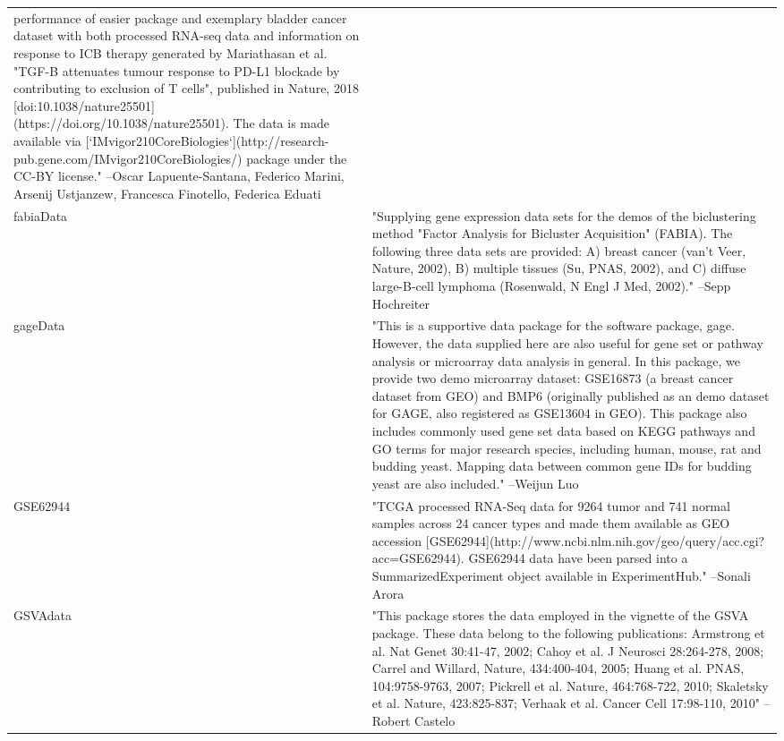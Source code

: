 \documentclass[]{article}
\begin{document}
\begin{longtable}[t]{l>{\raggedright\arraybackslash}p{25em}}
performance of easier package and exemplary bladder cancer
dataset with both processed RNA-seq data and information on
response to ICB therapy generated by Mariathasan et al. "TGF-B
attenuates tumour response to PD-L1 blockade by contributing to
exclusion of T cells", published in Nature, 2018
[doi:10.1038/nature25501](https://doi.org/10.1038/nature25501).
The data is made available via
[`IMvigor210CoreBiologies`](http://research-pub.gene.com/IMvigor210CoreBiologies/)
package under the CC-BY license." --Oscar Lapuente-Santana, Federico Marini, Arsenij Ustjanzew, Francesca Finotello, Federica Eduati\\
fabiaData & "Supplying gene expression data sets for the demos of the
biclustering method "Factor Analysis for Bicluster Acquisition"
(FABIA). The following three data sets are provided: A) breast
cancer (van't Veer, Nature, 2002), B) multiple tissues (Su,
PNAS, 2002), and C) diffuse large-B-cell lymphoma (Rosenwald, N
Engl J Med, 2002)." --Sepp Hochreiter\\
gageData & "This is a supportive data package for the software
package, gage. However, the data supplied here are also useful
for gene set or pathway analysis or microarray data analysis in
general. In this package, we provide two demo microarray
dataset: GSE16873 (a breast cancer dataset from GEO) and BMP6
(originally published as an demo dataset for GAGE, also
registered as GSE13604 in GEO). This package also includes
commonly used gene set data based on KEGG pathways and GO terms
for major research species, including human, mouse, rat and
budding yeast. Mapping data between common gene IDs for budding
yeast are also included." --Weijun Luo\\
GSE62944 & "TCGA processed RNA-Seq data for 9264 tumor and 741 normal
samples across 24 cancer types and made them available as GEO
accession
[GSE62944](http://www.ncbi.nlm.nih.gov/geo/query/acc.cgi?acc=GSE62944).
GSE62944 data have been parsed into a SummarizedExperiment
object available in ExperimentHub." --Sonali Arora\\
GSVAdata & "This package stores the data employed in the vignette of
the GSVA package. These data belong to the following
publications: Armstrong et al. Nat Genet 30:41-47, 2002; Cahoy
et al. J Neurosci 28:264-278, 2008; Carrel and Willard, Nature,
434:400-404, 2005; Huang et al. PNAS, 104:9758-9763, 2007;
Pickrell et al. Nature, 464:768-722, 2010; Skaletsky et al.
Nature, 423:825-837; Verhaak et al. Cancer Cell 17:98-110, 2010" --Robert Castelo\\

\end{longtable}
\end{document}
